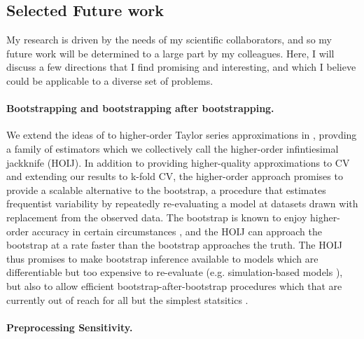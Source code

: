 %
%
%
\subsection*{Selected Future work}

My research is driven by the needs of my scientific collaborators, and
so my future work will be determined to a large part by my colleagues.
Here, I will discuss a few directions that I find promising and interesting,
and which I believe could be applicable to a diverse set of problems.

\paragraph{Bootstrapping and bootstrapping after bootstrapping.}

We extend the ideas of \citet{giordano:2020:bayesij} to higher-order Taylor
series approximations in \citet{giordano2019:hoij}, provding a family of
estimators which we collectively call the higher-order infintiesimal jackknife
(HOIJ).  In addition to providing higher-quality approximations to CV and
extending our results to k-fold CV, the higher-order approach promises to
provide a scalable alternative to the bootstrap, a procedure that estimates
frequentist variability by repeatedly re-evaluating a model at datasets drawn
with replacement from the observed data. The bootstrap is known to enjoy
higher-order accuracy in certain circumstances \citet{hall:2013:bootstrap}, and
the HOIJ can approach the bootstrap at a rate faster than the bootstrap
approaches the truth.  The HOIJ thus promises to make bootstrap inference
available to models which are differentiable but too expensive to re-evaluate
(e.g. simulation-based models \citep{gourieroux:1993:simulation}), but also to
allow efficient bootstrap-after-bootstrap procedures which that are currently
out of reach for all but the simplest statsitics \citet{efron:1994:bootstrap}.


\paragraph{Preprocessing Sensitivity.}

